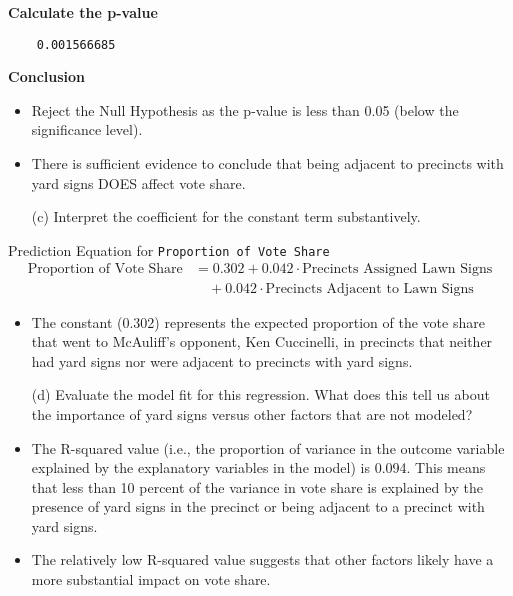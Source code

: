 \documentclass[12pt,letterpaper]{article}
\begin{document}
\noindent\textbf {Calculate the p-value}

\begin{verbatim}
	0.001566685
\end{verbatim}

\noindent\textbf {Conclusion}
\begin{itemize}[left=0pt]
	\item 
	Reject the Null Hypothesis as the p-value is less than 0.05 (below the significance level).   
	\item 
	There is sufficient evidence to conclude that being adjacent to precincts with yard signs DOES affect vote share. 
\end{itemize}

\vspace{0.5cm}
\begin{enumerate}
	\item [(c)] Interpret the coefficient for the constant term substantively.
\end{enumerate}
\noindent Prediction Equation for \texttt{Proportion of Vote Share}
\begin{equation}
	\begin{split}
		\text{Proportion of Vote Share} &= 0.302 + 0.042 \cdot \text{Precincts Assigned Lawn Signs} \\
		&\quad + 0.042 \cdot \text{Precincts Adjacent to Lawn Signs}
	\end{split}
\end{equation}

\vspace{0.25cm}
\begin{itemize}[left=0pt]
	\item 
	The constant (0.302) represents the expected proportion of the vote share that went to McAuliff's opponent, Ken Cuccinelli, in precincts that neither had yard signs nor were adjacent to precincts with yard signs.  
\end{itemize}

\newpage
\begin{enumerate}
	\item [(d)] Evaluate the model fit for this regression.  What does this	tell us about the importance of yard signs versus other factors that are not modeled?
\end{enumerate}  
\begin{itemize}[left=0pt]
	\item 
	The R-squared value (i.e., the proportion of variance in the outcome variable explained by the explanatory variables in the model) is 0.094. This means that less than 10 percent of the variance in vote share is explained by the presence of yard signs in the precinct or being adjacent to a precinct with yard signs.
	\item  
	The relatively low R-squared value suggests that other factors likely have a more substantial impact on vote share.
\end{itemize}
\end{document}
